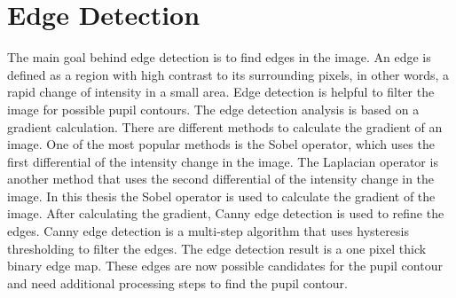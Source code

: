 \section{Edge Detection}
The main goal behind edge detection is to find edges in the image. An edge is defined as a region with high contrast to its surrounding pixels, in other words, a rapid change of intensity in a small area. Edge detection is helpful to filter the image for possible pupil contours. The edge detection analysis is based on a gradient calculation. There are different methods to calculate the gradient of an image. One of the most popular methods is the Sobel operator, which uses the first differential of the intensity change in the image. The Laplacian operator is another method that uses the second differential of the intensity change in the image. In this thesis the Sobel operator is used to calculate the gradient of the image. 
After calculating the gradient, Canny edge detection is used to refine the edges. Canny edge detection is a multi-step algorithm that uses hysteresis thresholding to filter the edges. The edge detection result is a one pixel thick binary edge map.  These edges are now possible candidates for the pupil contour and need additional processing steps to find the pupil contour. 
